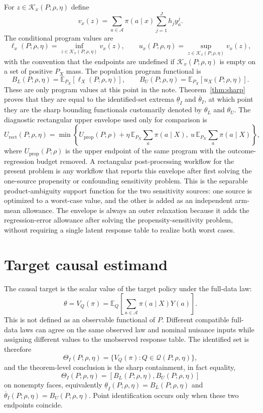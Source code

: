\documentclass[11pt]{article}
\newcommand{\E}{\mathbb{E}}
\theoremstyle{definition}
\theoremstyle{plain}
\theoremstyle{remark}
\begin{document}
For $z\in\mathcal K_x(P;\rho,\eta)$ define
\[
  v_x(z)=\sum_{a\in\mathcal A}\pi(a\mid x)
       \sum_{j=1}^J h_j y^j_a.
\]
The conditional program values are
\[
  \ell_x(P;\rho,\eta)=\inf_{z\in\mathcal K_x(P;\rho,\eta)}v_x(z),
  \qquad
  u_x(P;\rho,\eta)=\sup_{z\in\mathcal K_x(P;\rho,\eta)}v_x(z),
\]
with the convention that the endpoints are undefined if
$\mathcal K_x(P;\rho,\eta)$ is empty on a set of positive $P_X$ mass.  The
population program functional is
\[
  B_L(P;\rho,\eta)=\E_{P_X}[\ell_X(P;\rho,\eta)],\qquad
  B_U(P;\rho,\eta)=\E_{P_X}[u_X(P;\rho,\eta)].
\]
These are only program values at this point in the note.  Theorem~\ref{thm:sharp}
proves that they are equal to the identified-set extrema
$\underline{\theta}_I$ and $\overline{\theta}_I$, at which point they are the sharp
bounding functionals customarily denoted by $\theta_L$ and $\theta_U$.  The
diagnostic rectangular upper envelope used only for comparison is
\[
  U_{\mathrm{rect}}(P;\rho,\eta)
  =\min\left\{
       U_{\mathrm{prop}}(P;\rho)
       +\eta\,\E_{P_X}\sum_a\pi(a\mid X),\
       u\,\E_{P_X}\sum_a\pi(a\mid X)
     \right\},
\]
where $U_{\mathrm{prop}}(P;\rho)$ is the upper endpoint of the same program with
the outcome-regression budget removed.  A rectangular post-processing workflow
for the present problem is any workflow that reports this envelope after first
solving the one-source propensity or confounding sensitivity problem.  This is
the separable product-ambiguity support function for the two sensitivity
sources: one source is optimized to a worst-case value, and the other is added
as an independent arm-mean allowance.  The envelope is always an outer
relaxation because it adds the regression-error allowance after solving the
propensity-sensitivity problem, without requiring a single latent response table
to realize both worst cases.

\section{Target causal estimand}
The causal target is the scalar value of the target policy under the full-data
law:
\[
  \theta=V_Q(\pi)=\E_Q\left[\sum_{a\in\mathcal A}\pi(a\mid X)Y(a)\right].
\]
This is not defined as an observable functional of $P$.  Different compatible
full-data laws can agree on the same observed law and nominal nuisance inputs
while assigning different values to the unobserved response table.  The
identified set is therefore
\[
  \Theta_I(P;\rho,\eta)
  =\{V_Q(\pi):Q\in\mathcal Q(P;\rho,\eta)\},
\]
and the theorem-level conclusion is the sharp containment, in fact equality,
\[
  \Theta_I(P;\rho,\eta)=[B_L(P;\rho,\eta),B_U(P;\rho,\eta)]
\]
on nonempty faces, equivalently
$\underline{\theta}_I(P;\rho,\eta)=B_L(P;\rho,\eta)$ and
$\overline{\theta}_I(P;\rho,\eta)=B_U(P;\rho,\eta)$.  Point identification occurs
only when these two endpoints coincide.
\end{document}
